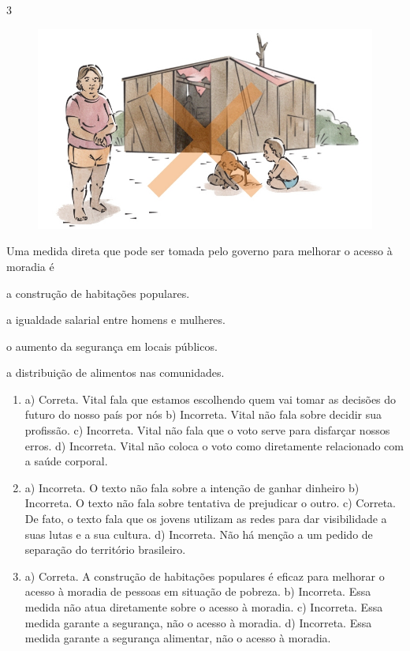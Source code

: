 \num{3}

\begin{figure}[htpb!]
\includegraphics[width=.5\textwidth]{./imgs/img52.jpg}
\end{figure}

\noindent{}Uma medida direta que pode ser tomada pelo governo para melhorar o
acesso à moradia é

\begin{escolha}
\item a construção de habitações populares.

\item a igualdade salarial entre homens e mulheres.

\item o aumento da segurança em locais públicos.

\item a distribuição de alimentos nas comunidades.
\end{escolha}



\begin{enumerate}

\item
a) Correta. Vital fala que estamos escolhendo quem vai tomar as decisões
do futuro do nosso país por nós
b) Incorreta. Vital não fala sobre decidir sua profissão.
c) Incorreta. Vital não fala que o voto serve para disfarçar nossos
erros.
d) Incorreta. Vital não coloca o voto como diretamente relacionado com a
saúde corporal.

\item
a) Incorreta. O texto não fala sobre a intenção de ganhar dinheiro
b) Incorreta. O texto não fala sobre tentativa de prejudicar o outro.
c) Correta. De fato, o texto fala que os jovens utilizam as redes para
dar visibilidade a suas lutas e a sua cultura.
d) Incorreta. Não há menção a um pedido de separação do território
brasileiro.

\item
a) Correta. A construção de habitações populares é eficaz para melhorar
o acesso à moradia de pessoas em situação de pobreza.
b) Incorreta. Essa medida não atua diretamente sobre o acesso à moradia.
c) Incorreta. Essa medida garante a segurança, não o acesso à moradia.
d) Incorreta. Essa medida garante a segurança alimentar, não o acesso
à moradia.
\end{enumerate}

